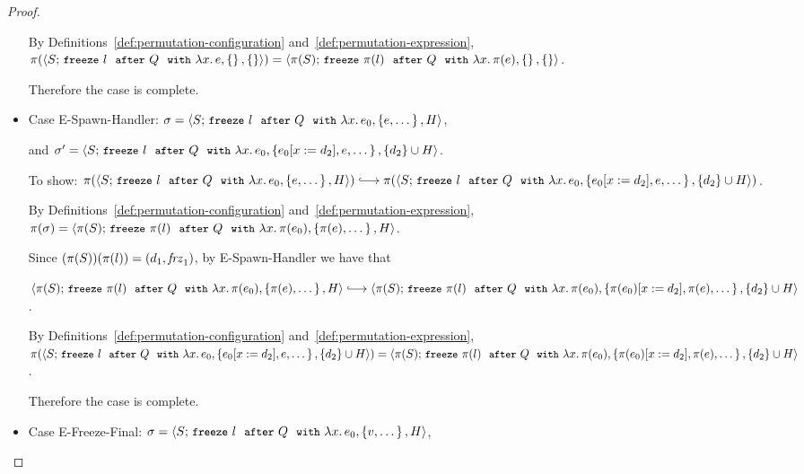 \begin{proof}
\begin{itemize}
    By Definitions~\ref{def:permutation-configuration}
    and~\ref{def:permutation-expression},
    $\pi(\langle S;\, \mbox{\small{\texttt{freeze}}}~l~~{\mbox{\small{\texttt{after}}}}~Q~~{\mbox{\small{\texttt{with}}}}~\lambda x.\,e, \left\{\right\}, \left\{\right\} \rangle) = \\
    \langle \pi(S);\, \mbox{\small{\texttt{freeze}}}~\pi(l)~~{\mbox{\small{\texttt{after}}}}~Q~~{\mbox{\small{\texttt{with}}}}~\lambda x.\,\pi(e), \left\{\right\}, \left\{\right\} \rangle$.

    Therefore the case is complete.

  \item Case {\sc E-Spawn-Handler}: $\sigma =
    \langle S;\, \mbox{\small{\texttt{freeze}}}~l~~{\mbox{\small{\texttt{after}}}}~Q~~{\mbox{\small{\texttt{with}}}}~\lambda x.\,e_0, \left\{e,
          \dots\right\}, H \rangle$,

    and $\sigma' =
    \langle S;\, \mbox{\small{\texttt{freeze}}}~l~~{\mbox{\small{\texttt{after}}}}~Q~~{\mbox{\small{\texttt{with}}}}~\lambda x.\,e_0, \left\{e_0[x := d_2],
          e, \dots\right\}, \{d_2\}\cup H \rangle$.

    To show:
    $\pi(\config{S}{\freezeafterfull{l}{Q}{\lam{x}{e_0}}{\setof{e,
          \dots}}{H}}) \parstepsto \\
    \pi(\config{S}{\freezeafterfull{l}{Q}{\lam{x}{e_0}}{\setof{\subst{e_0}{x}{d_2},
          e, \dots}} {\{d_2\}\cup H}})$.

    By Definitions~\ref{def:permutation-configuration}
    and~\ref{def:permutation-expression}, $\pi(\sigma) = \\
    \langle \pi(S);\, \mbox{\small{\texttt{freeze}}}~\pi(l)~~{\mbox{\small{\texttt{after}}}}~Q~~{\mbox{\small{\texttt{with}}}}~\lambda x.\,\pi(e_0), \left\{\pi(e),
          \dots\right\}, H \rangle$.

    Since $(\pi(S))(\pi(l)) = (d_1, \mathit{frz}_1)$, by {\sc
      E-Spawn-Handler} we have that

    $\config{\pi(S)}{\freezeafterfull{\pi(l)}{Q}{\lam{x}{\pi(e_0)}}{\setof{\pi(e),
          \dots}}{H}} \parstepsto \\
    \config{\pi(S)}{\freezeafterfull{\pi(l)}{Q}{\lam{x}{\pi(e_0)}}{\setof{\subst{\pi(e_0)}{x}{d_2},
          \pi(e), \dots}} {\{d_2\}\cup H}}$.

    By Definitions~\ref{def:permutation-configuration}
    and~\ref{def:permutation-expression},
    $\pi(\langle S;\, \mbox{\small{\texttt{freeze}}}~l~~{\mbox{\small{\texttt{after}}}}~Q~~{\mbox{\small{\texttt{with}}}}~\lambda x.\,e_0, \left\{e_0[x := d_2],
          e, \dots\right\}, \{d_2\}\cup H \rangle) =
    \langle \pi(S);\, \mbox{\small{\texttt{freeze}}}~\pi(l)~~{\mbox{\small{\texttt{after}}}}~Q~~{\mbox{\small{\texttt{with}}}}~\lambda x.\,\pi(e_0), \left\{\pi(e_0)[x := d_2],
          \pi(e), \dots\right\}, \{d_2\}\cup H \rangle$.

    Therefore the case is complete.

  \item Case {\sc E-Freeze-Final}: $\sigma =
    \langle S;\, \mbox{\small{\texttt{freeze}}}~l~~{\mbox{\small{\texttt{after}}}}~Q~~{\mbox{\small{\texttt{with}}}}~\lambda x.\,e_0, \left\{v,
          \dots\right\}, H \rangle$,


\end{itemize}
\end{proof}
